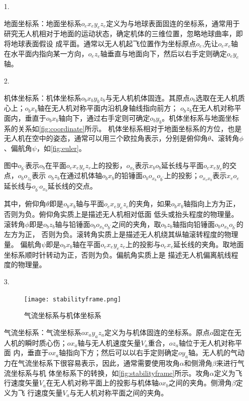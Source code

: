 \begin{itemize}
    \item [1.] 

        地面坐标系：地面坐标系$o_{e}x_{e}y_{e}z_{e}$定义为与地球表面固连的坐标系，通常用于研究无人机相对于地面的运动状态，确定机体的三维位置，忽略地球曲率，即将地球表面假设
        成平面。通常以无人机起飞位置作为坐标原点$o_{e}$,先让$o_{e}x_{e}$轴在水平面内指向某一方向，$o_{e}z_{e}$轴垂直与地面向下，然后以右手定则确定$o_{e}y_{e}$轴。       
    \item [2.]

        机体坐标系：机体坐标系$o_{b}x_{b}y_{b}z_{b}$与无人机机体固连。其原点$o_{b}$选取在无人机质心上；$o_{b}x_{b}$轴在无人机对称平面内沿机身轴线指向前方；
        $o_{b}z_{b}$在无人机对称平面内，垂直于$o_{b}x_{b}$轴向下，通过右手定则可确定$o_{b}y_{b}$。机体坐标系与地面坐标系的关系如\autoref{fig:coordinate}所示。
        机体坐标系相对于地面坐标系的方位，也是无人机在空中的姿态，通常可以用三个欧拉角表示，分别是俯仰角$\theta$、滚转角$\phi$、偏航角$\psi$，如\autoref{fig:euler}。

        图中$o_{b^{'}}$表示$o_{b}$在平面$o_{e}x_{e}y_{e}z_{e}$上的投影，$o_{x_{b}}$表示$x_{b}o_{b}$延长线与平面$o_{e}x_{e}y_{e}$的交点，$o_{b}o_{z_{b}}$表示
        $o_{b}z_{b}$在通过机体轴$o_{b}x_{b}$的铅锤面$o_{b}o_{x_{b}}o_{b^{'}}$上的投影；$o_{x_{e}x_{b}}$表示$x_{e}o_{e}$延长线与$o_{b^{'}}o_{x_{b}}$延长线的交点。

        其中，俯仰角$\theta$即是$o_{b}x_{b}$轴与平面$o_{e}x_{e}y_{e}z_{e}$的夹角，如果$o_{b}x_{b}$轴指向上方为正，否则为负。俯仰角实质上是描述无人机相对低面
        低头或抬头程度的物理量。
        滚转角$\phi$即是$o_{b}z_{b}$轴与铅锤面$o_{b}o_{x_{b}}o_{b^{'}}$之间的夹角，取$o_{b}z_{b}$轴指向铅锤面$o_{b}o_{x_{b}}o_{b^{'}}$的左方为正，
        否则为负。滚转角实质上是描述无人机绕其纵轴滚转程度的物理量。
        偏航角$\psi$即是$o_{b}x_{b}$轴在平面$o_{e}x_{e}y_{e}z_{e}$上的投影与$o_{e}x_{e}$延长线的夹角。取地面坐标系顺时针转动为正，否则为负。偏航角实质上是
        描述无人机偏离航线程度的物理量。
        \item [3.]
        \begin{figure}
            \centering
            \texttt{[image: stabilityframe.png]}
            \caption{\label{fig:stabilityframe}气流坐标系与机体坐标系}
        \end{figure}
        气流坐标系：气流坐标系$ox_{a}y_{a}z_{a}$定义为与机体固连的坐标系。原点$o$固定在无人机的瞬时质心伤；$ox_{a}$轴与无人机速度矢量$V_{a}$重合，$oz_{a}$轴位于无人机对称平面
        内，垂直于$ox_{a}$轴指向下方；然后可以以右手定则确定$oy_{a}$轴。无人机的气动力在气流坐标系下很容易表示，因此，通常需要使用攻角$\alpha$和侧滑角$\beta$来进行气流坐标系与机
        体坐标系下的转换，如\autoref{fig:stabilityframe}所示。攻角$\alpha$定义为飞行速度矢量$V_{a}$在无人机对称平面上的投影与机体轴$ox_{b}$之间的夹角。侧滑角$\beta$定义为飞
        行速度矢量$V_{a}$与无人机对称平面之间的夹角。
\end{itemize}

